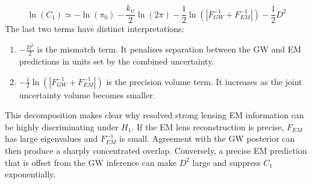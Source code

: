 \documentclass[pdflatex,sn-mathphys-num]{sn-jnl}%
\theoremstyle{thmstyleone}%
\theoremstyle{thmstyletwo}%
\theoremstyle{thmstylethree}%
\begin{document}
\begin{appendices}
\begin{equation}
\ln(C_1) \simeq -\ln(\pi_0)-\frac{k_{\psi}}{2}\ln(2\pi)-\frac{1}{2}\ln(|F_{GW}^{-1}+F_{EM}^{-1}|)-\frac{1}{2}D^2
\end{equation}
The last two terms have distinct interpretations:
\begin{enumerate}
	\item $-\frac{D^2}{2}$ is the mismatch term. It penalises separation between the GW and EM predictions in units set by the combined uncertainty.
	\item $-\frac{1}{2}\ln(|F_{GW}^{-1}+F_{EM}^{-1}|)$ is the precision volume term. It increases as the joint uncertainty volume becomes smaller.
\end{enumerate}
This decomposition makes clear why resolved strong lensing EM information can be highly discriminating under $H_1$.
If the EM lens reconstruction is precise, $F_{EM}$ has large eigenvalues and $F_{EM}^{-1}$ is small.
Agreement with the GW posterior can then produce a sharply concentrated overlap.
Conversely, a precise EM prediction that is offset from the GW inference can make $D^2$ large and suppress $C_1$ exponentially.

\end{appendices}
\end{document}
